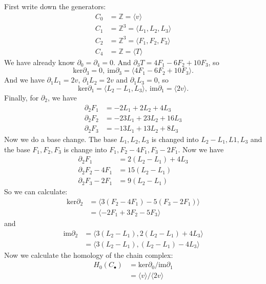 \documentclass[a4paper, 11pt]{article}
\begin{document}
\begin{solution}
First write down the generators:
\begin{align*}
    C_0 & =\mathbb{Z}  =\langle v\rangle \\ 
    C_1 & =\mathbb{Z}^3  =\langle L_1,L_2,L_3\rangle\\ 
    C_2 & =\mathbb{Z}^3  =\langle F_1,F_2,F_3\rangle\\
    C_4 & =\mathbb{Z}  =\langle T\rangle  
\end{align*}
We have already know \(\partial_0=\partial_4=0\). And \(\partial_3 T=4F_1-6F_2+10F_3\), so 
$$\text{ker}\partial_3=0,\ \text{im}\partial_3=\langle 4F_1-6F_2+10F_3\rangle.$$
And we have \(\partial_1 L_1=2v\), \(\partial_1 L_2=2v\) and \(\partial_1 L_3=0\), so 
$$\text{ker}\partial_1=\langle L_2-L_1, L_3\rangle,\ \text{im}\partial_1=\langle 2v\rangle.$$
Finally, for \(\partial_2\), we have 
\begin{align*}
    \partial_2 F_1 & =-2L_1+2L_2+4L_3\\ 
    \partial_2 F_2 & =-23L_1+23L_2+16L_3\\ 
    \partial_2 F_3 & =-13L_1+13L_2+8L_3
\end{align*}
Now we do a base change. The base \(L_1,L_2,L_3\) is changed into \(L_2-L_1,L1,L_3\) and the base \(F_1,F_2,F_3\) is change into \(F_1,F_2-4F_1,F_3-2F_1\). Now 
we have 
\begin{align*}
    \partial_2 F_1 & =2(L_2-L_1)+4L_3\\ 
    \partial_2 F_2-4F_1 & =15(L_2-L_1)\\ 
    \partial_2 F_3-2F_1 & =9(L_2-L_1)
\end{align*}
So we can calculate:
\begin{align*}
    \text{ker}\partial_2 & =\langle 3(F_2-4F_1)-5(F_3-2F_1)\rangle\\ 
                         & =\langle -2F_1+3F_2-5F_3\rangle 
\end{align*}
and 
\begin{align*}
    \text{im}\partial_2 & = \langle 3(L_2-L_1), 2(L_2-L_1)+4L_3\rangle\\ 
                        & = \langle 3(L_2-L_1), (L_2-L_1)-4L_3\rangle
\end{align*}
Now we calculate the homology of the chain complex:
\begin{align*}
    H_0(C_\bullet) & = \text{ker}{\partial_0}/\text{im}\partial_1\\ 
                   & = \langle v \rangle/\langle 2v\rangle\\ 

\end{align*}
\end{solution}
\end{document}
